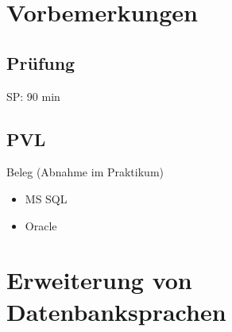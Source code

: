 \newcommand{\customDir}{../}








%



\maketitle
\newpage
\tableofcontents
\newpage
\chapter*{Vorbemerkungen}
\section*{Prüfung}
SP: 90 min

\section*{PVL}
Beleg (Abnahme im Praktikum)
\begin{itemize}
\item MS SQL
\item Oracle
\end{itemize}

\chapter{Erweiterung von Datenbanksprachen}

